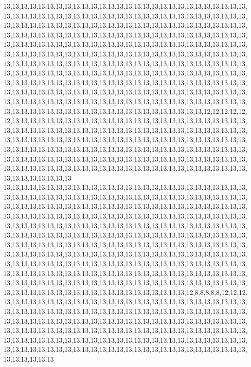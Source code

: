 13,13,13,13,13,13,13,13,13,13,13,13,13,13,13,13,13,13,13,13,13,13,13,13,13,13,13,13,13,13,13,13,13,13,13,13,13,13,13,13,13,13,13,13,13,13,13,13,13,13,13,13,13,13,13,13,13,13,13,13,13,13,13,13,13,13,13,13,13,13,13,13,13,13,13,13,13,13,13,13,13,13,13,13,13,13,13,13,13,13,13,13,13,13,13,13,13,13,13,13,13,13,13,13,13,13,13,13,13,13,13,13,13,13,13,13,13,13,13,13,13,13,13,13,13,13,13,13,13,13,13,13,13,13,13,13,13,13,13,13,13,13,13,13,13,13,13,13,13,13,13,13,13,13,13,13,13,13,13,13,13,13,13,13,13,13,13,13,13,13,13,13,13,13,13,13,13,13,13,13,13,13,13,13,13,13,13,13,13,13,13,13,13,13,13,13,13,13,13,13,13,13,13,13,13,13,13,13,13,13,13,13,13,13,13,13,13,13,13,13,13,13,13,13,13,13,13,13,13,13,13,13,13,13,13,13,13,13,13,13,13,13,13,13,13,13,13,13,13,13,13,13,13,13,13,13,13,13,13,13,13,13,13,13,13,13,13,13,13,13,13,13,13,13,13,13,13,13,13,13,13,13,13,13,13,13,13,13,13,13,13,13,13,13,13,13,13,13,13,13,13,13,13,13,13,13,13,13,13,13,13,13,13,13,13,13,13,13,13,13,13,13,13,13,13,13,13,13,13,13,13,12,12,12,12,12,12,13,13,13,13,13,13,13,13,13,13,13,13,13,13,13,13,13,13,13,13,13,13,13,13,13,13,13,13,13,13,13,13,13,13,13,13,13,13,13,13,13,13,13,13,13,13,13,13,13,13,13,13,13,13,13,13,13,13,13,13,13,13,13,13,13,13,13,13,13,13,13,13,13,13,13,13,13,13,13,13,13,13,13,13,13,13,13,13,13,13,13,13,13,13,13,13,13,13,13,13,13,13,13,13,13,13,13,13,13,13,13,13,13,13,13,13,13,13,13,13,13,13,13,13,13,13,13,13,13,13,13,13,13,13,13,13,13,13,13,13,13,13,13,13,13,13,13,13,13,13,13,13,13,13,13,13,13,13,13,13,13,13,13,13,13,13,13,13,13,13,13,13,13,13,13
13,13,13,13,13,13,13,13,13,13,13,13,13,13,13,13,13,13,13,13,13,13,13,13,13,13,13,13,13,13,13,13,13,13,13,13,13,13,13,13,13,13,13,13,13,13,13,13,13,13,13,13,13,13,13,13,13,13,13,13,13,13,13,13,13,13,13,13,13,13,13,13,13,13,13,13,13,13,13,13,13,13,13,13,13,13,13,13,13,13,13,13,13,13,13,13,13,13,13,13,13,13,13,13,13,13,13,13,13,13,13,13,13,13,13,13,13,13,13,13,13,13,13,13,13,13,13,13,13,13,13,13,13,13,13,13,13,13,13,13,13,13,13,13,13,13,13,13,13,13,13,13,13,13,13,13,13,13,13,13,13,13,13,13,13,13,13,13,13,13,13,13,13,13,13,13,13,13,13,13,13,13,13,13,13,13,13,13,13,13,13,13,13,13,13,13,13,13,13,13,13,13,13,13,13,13,13,13,13,13,13,13,13,13,13,13,13,13,13,13,13,13,13,13,13,13,13,13,13,13,13,13,13,13,13,13,13,13,13,13,13,13,13,13,13,13,13,13,13,13,13,13,13,13,13,13,13,13,13,13,13,13,13,13,13,13,13,13,13,13,13,13,13,13,13,13,13,13,13,13,13,13,13,13,13,13,13,13,13,13,13,13,13,13,13,13,13,13,13,13,13,13,13,13,13,13,13,13,13,13,13,13,13,13,13,13,13,13,13,13,13,13,13,13,13,13,13,13,13,12,8,8,8,8,8,12,12,12,13,13,13,13,13,13,13,13,13,13,13,13,13,13,13,13,13,13,13,13,13,13,13,13,13,13,13,13,13,13,13,13,13,13,13,13,13,13,13,13,13,13,13,13,13,13,13,13,13,13,13,13,13,13,13,13,13,13,13,13,13,13,13,13,13,13,13,13,13,13,13,13,13,13,13,13,13,13,13,13,13,13,13,13,13,13,13,13,13,13,13,13,13,13,13,13,13,13,13,13,13,13,13,13,13,13,13,13,13,13,13,13,13,13,13,13,13,13,13,13,13,13,13,13,13,13,13,13,13,13,13,13,13,13,13,13,13,13,13,13,13,13,13,13,13,13,13,13,13,13,13,13,13,13,13,13,13,13,13,13,13,13,13,13,13,13,13,13,13,13,13,13,13,13
